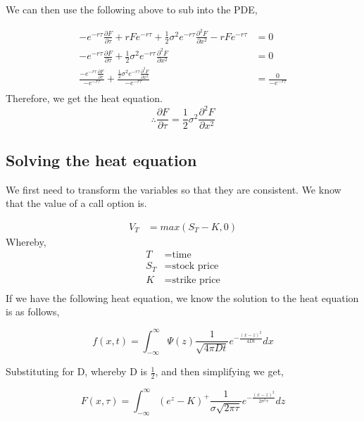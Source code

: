 \documentclass[12pt]{article}
\begin{document}
We can then use the following above to sub into the PDE,

\begin{align*}
-e^{-r\tau}\frac{\partial F}{\partial \tau} + rFe^{-r\tau}+\frac{1}{2}\sigma ^2 e^{-r\tau}\frac{\partial ^2F}{\partial x^2}-rFe^{-r\tau} &= 0\\
-e^{-r\tau}\frac{\partial F}{\partial \tau} + \frac{1}{2}\sigma ^2 e^{-r\tau}\frac{\partial ^2 F}{\partial x^2} &= 0 \\
\frac{-e^{-r\tau}\frac{\partial F}{\partial \tau}}{-e^{-r\tau}}+\frac{\frac{1}{2}\sigma ^2 e^{-r\tau}\frac{\partial ^2 F}{\partial  x^2}}{-e^{-r\tau}} &= \frac{0}{-e^{-r\tau}} \\  
\end{align*}
Therefore, we get the heat equation.
\begin{equation}
\therefore \frac{\partial F}{\partial \tau} = \frac{1}{2}\sigma ^2 \frac{\partial ^2 F}{\partial x^2}
\end{equation}

\subsection{Solving the heat equation}
We first need to transform the variables so that they are consistent. We know that the value of a call option is.

\begin{align*}
	V_{T} &= max(S_{T} - K, 0)
\end{align*}
Whereby,
\begin{align*}
T &= \text{time} \\
S_{T} &= \text{stock price} \\
K &= \text{strike price} \\
\end{align*}
If we have the following heat equation, we know the solution to the heat equation is as follows,

\begin{equation}
f(x, t) = \int_{-\infty}^{\infty} \Psi(z) \frac{1}{\sqrt{4\pi Dt}}e^{-\frac{(x - z)^2}{4Dt}}dx
\end{equation}

Substituting for D, whereby D is $\frac{1}{2}$, and then simplifying we get,

\begin{equation}
F(x, \tau) = \int_{-\infty}^{\infty}(e^{z}-K)^{+}\frac{1}{\sigma \sqrt{2 \pi \tau}}e^{-\frac{(x-z)^2}{2\sigma^2 \tau}}dz
\end{equation}
\end{document}
